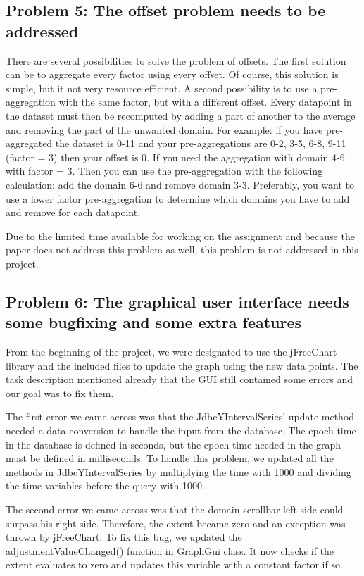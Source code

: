 \subsection{Problem 5: The offset problem needs to be addressed}
There are several possibilities to solve the problem of offsets. The first solution can be to aggregate every factor using every offset. Of course, this solution is simple, but it not very resource efficient. A second possibility is to use a pre-aggregation with the same factor, but with a different offset. Every datapoint in the dataset must then be recomputed by adding a part of another to the average and removing the part of the unwanted domain. For example: if you have pre-aggregated the dataset is 0-11 and your pre-aggregations are 0-2, 3-5, 6-8, 9-11 (factor = 3) then your offset is 0. If you need the aggregation with domain 4-6 with factor = 3. Then you can use the pre-aggregation with the following calculation: add the domain 6-6 and remove domain 3-3. Preferably, you want to use a lower factor pre-aggregation to determine which domains you have to add and remove for each datapoint.

Due to the limited time available for working on the assignment and because the paper\cite{wombacher2011} does not address this problem as well, this problem is not addressed in this project.

\subsection{Problem 6: The graphical user interface needs some bugfixing and some extra features}
From the beginning of the project, we were designated to use the jFreeChart library and the included files to update the graph using the new data points. The task description mentioned already that the GUI still contained some errors and our goal was to fix them.

The first error we came across was that the JdbcYIntervalSeries' update method needed a data conversion to handle the input from the database. The epoch time in the database is defined in seconds, but the epoch time needed in the graph must be defined in milliseconds. To handle this problem, we updated all the methods in JdbcYIntervalSeries by multiplying the time with 1000 and dividing the time variables before the query with 1000.

The second error we came across was that the domain scrollbar left side could surpass his right side. Therefore, the extent became zero and an exception was thrown by jFreeChart. To fix this bug, we updated the adjustmentValueChanged() function in GraphGui class. It now checks if the extent evaluates to zero and updates this variable with a constant factor if so.

